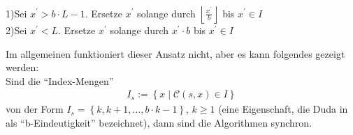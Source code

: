 \documentclass[a4paper,12pt]{article}
\newcommand{\C}{\mathcal C}
\begin{document}
\begin{flushleft}
1)\;Sei  $x^{'} > b\cdot L -1$. Ersetze $x^{'}$ solange durch  $\left\lfloor \frac{x^{'}}{b}  \right\rfloor$  bis $x^{'} \in I$
\\
2)\;Sei  $x^{'} <L$. Ersetze $x^{'}$ solange durch  $x^{'} \cdot b$  bis $x^{'} \in I$
\end{flushleft}
Im allgemeinen funktioniert dieser Ansatz nicht, aber es kann folgendes gezeigt werden:
\\
Sind die "`Index-Mengen"' 
\begin{align*}
I_{s} := \left\{ x\;|\; \C(s,x) \in I  \right\}
\end{align*} 
von der Form $I_s = \left\{k,k+1,\ldots,b\cdot k -1\right\},\, k\geq 1$ (eine Eigenschaft, die Duda in \cite{Duda} als "`b-Eindeutigkeit"' bezeichnet), dann sind die Algorithmen synchron. 
\end{document}
